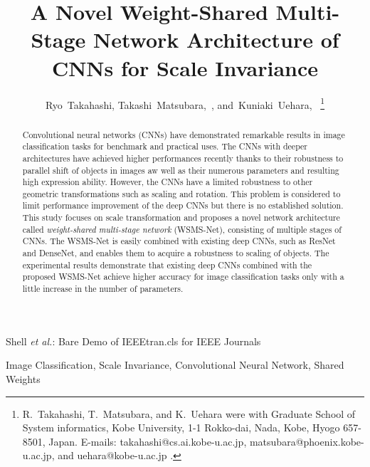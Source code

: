\documentclass[journal]{IEEEtran}
\begin{document}
\title{A Novel Weight-Shared Multi-Stage Network Architecture of CNNs for Scale Invariance}
\author{Ryo~Takahashi,
        Takashi~Matsubara,~,
        and~Kuniaki~Uehara,~%
\thanks{R.~Takahashi, T.~Matsubara, and K.~Uehara were with Graduate School of System informatics, Kobe University, 1-1 Rokko-dai, Nada, Kobe, Hyogo 657-8501, Japan. E-mails: takahashi@cs.ai.kobe-u.ac.jp, matsubara@phoenix.kobe-u.ac.jp, and uehara@kobe-u.ac.jp
.}
}
%
{Shell \MakeLowercase{\textit{et al.}}: Bare Demo of IEEEtran.cls for IEEE Journals}

\maketitle

\begin{abstract}
Convolutional neural networks (CNNs) have demonstrated remarkable results in image classification tasks for benchmark and practical uses.
The CNNs with deeper architectures have achieved higher performances recently thanks to their robustness to parallel shift of objects in images aw well as their numerous parameters and resulting high expression ability.
However, the CNNs have a limited robustness to other geometric transformations such as scaling and rotation.
This problem is considered to limit performance improvement of the deep CNNs but there is no established solution.
This study focuses on scale transformation and proposes a novel network architecture called \emph{weight-shared multi-stage network} (WSMS-Net), consisting of multiple stages of CNNs.
The WSMS-Net is easily combined with existing deep CNNs, such as ResNet and DenseNet, and enables them to acquire a robustness to scaling of objects.
The experimental results demonstrate that existing deep CNNs combined with the proposed WSMS-Net achieve higher accuracy for image classification tasks only with a little increase in the number of parameters.
\end{abstract}

\begin{IEEEkeywords}
Image Classification, Scale Invariance, Convolutional Neural Network, Shared Weights
\end{IEEEkeywords}


%
\IEEEpeerreviewmaketitle
\end{document}
